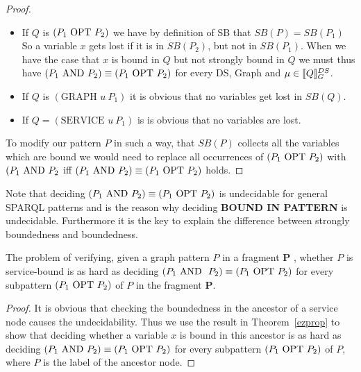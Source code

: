 \begin{proof}
\begin{itemize}
		\item If $Q$ is $(P_1 \mbox{ OPT }  P_2)$ we have by definition of SB that $SB(P) = SB(P_1)$
			So a variable $x$ gets lost if it is in $SB(P_2)$, but not in
			$SB(P_1)$. When we have the case that $x$ is bound in $Q$ but not
			strongly bound in $Q$ we must thus have $(P_1 \mbox{ AND }  P_2) \equiv
			(P_1 \mbox{ OPT }  P_2)$ for every DS, Graph and $\mu \in \llbracket Q
			\rrbracket^{DS}_G$.
		\item If $Q$ is $(\mbox{GRAPH } u \ P_1)$ it is obvious that no variables get lost
			in $SB(Q)$.
		\item If $Q = (\mbox{SERVICE }  u \ P_1)$ is is obvious that no variables are
			lost.
	\end{itemize}
	To modify our pattern $P$ in such a way, that $SB(P)$ collects all the
	variables which are bound we would need to replace all occurrences of  $(P_1
	\mbox{ OPT } P_2)$ with $(P_1 \mbox{ AND } P_2$ iff $(P_1 \mbox{ AND }  P_2) \equiv	(P_1 \mbox{ OPT }  P_2)$
	holds.
\end{proof}

Note that deciding $(P_1 \mbox{ AND } P_2) \equiv
(P_1 \mbox{ OPT }  P_2)$ is undecidable for general SPARQL patterns and is the reason
why deciding \textbf{BOUND IN PATTERN} is undecidable. Furthermore it is the key to explain
the difference between strongly boundedness and boundedness.

\begin{corollary}
	The problem of verifying, given a graph pattern $P$ in a fragment
	$\mathbf{P}$ , whether $P$ is
	service-bound is as hard as deciding $(P_1 \mbox{ AND } \ P_2) \equiv (P_1 \mbox{ OPT }
	P_2)$ for every subpattern $(P_1 \mbox{ OPT } P_2)$ of $P$ in the fragment
	$\mathbf{P}$.
\end{corollary}

\begin{proof}
	It is obvious that checking the boundedness in the ancestor of a service
	node causes the undecidability. Thus we use the result in Theorem~\ref{ezprop} to
	show that deciding whether a variable $x$ is bound in this ancestor is as
	hard as deciding $(P_1 \mbox{ AND } P_2)
	\equiv (P_1 \mbox{ OPT }  P_2)$ for every subpattern $(P_1 \mbox{ OPT } P_2)$ of $P$, where
	$P$ is the label of the ancestor node.
\end{proof}


